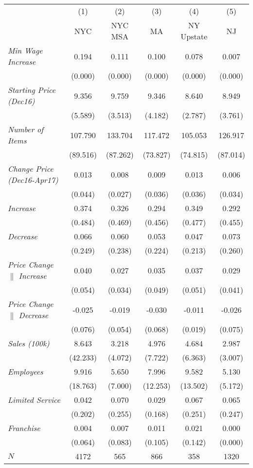 \begin{center}
\begin{tabular}{lccccc}
\hline  & (1) & (2) & (3) & (4) & (5)\\
 & NYC & NYC MSA & MA & NY Upstate & NJ\\
\hline  \textit{Min Wage Increase}  & 0.194 & 0.111 & 0.100 & 0.078 & 0.007\\
  & (0.000) & (0.000) & (0.000) & (0.000) & (0.000)\\
 \textit{Starting Price (Dec16)}  & 9.356 & 9.759 & 9.346 & 8.640 & 8.949\\
  & (5.589) & (3.513) & (4.182) & (2.787) & (3.761)\\
 \textit{Number of Items}  & 107.790 & 133.704 & 117.472 & 105.053 & 126.917\\
  & (89.516) & (87.262) & (73.827) & (74.815) & (87.014)\\
 \textit{Change Price (Dec16-Apr17)}  & 0.013 & 0.008 & 0.009 & 0.013 & 0.006\\
  & (0.044) & (0.027) & (0.036) & (0.036) & (0.034)\\
 \textit{Increase}  & 0.374 & 0.326 & 0.294 & 0.349 & 0.292\\
  & (0.484) & (0.469) & (0.456) & (0.477) & (0.455)\\
 \textit{Decrease}  & 0.066 & 0.060 & 0.053 & 0.047 & 0.073\\
  & (0.249) & (0.238) & (0.224) & (0.213) & (0.260)\\
 \textit{Price Change $\|$ Increase}  & 0.040 & 0.027 & 0.035 & 0.037 & 0.029\\
  & (0.054) & (0.034) & (0.049) & (0.051) & (0.041)\\
 \textit{Price Change $\|$ Decrease}  & -0.025 & -0.019 & -0.030 & -0.011 & -0.026\\
  & (0.076) & (0.054) & (0.068) & (0.019) & (0.075)\\
 \textit{Sales (100k)}  & 8.643 & 3.218 & 4.976 & 4.684 & 2.987\\
  & (42.233) & (4.072) & (7.722) & (6.363) & (3.007)\\
 \textit{Employees} & 9.916 & 5.650 & 7.996 & 9.582 & 5.130\\
  & (18.763) & (7.000) & (12.253) & (13.502) & (5.172)\\
 \textit{Limited Service}  & 0.042 & 0.070 & 0.029 & 0.067 & 0.065\\
  & (0.202) & (0.255) & (0.168) & (0.251) & (0.247)\\
 \textit{Franchise}  & 0.004 & 0.007 & 0.011 & 0.021 & 0.000\\
  & (0.064) & (0.083) & (0.105) & (0.142) & (0.000)\\
\hline  $ N $  & 4172 & 565 & 866 & 358 & 1320\\
\hline\end{tabular}\\
\end{center}
